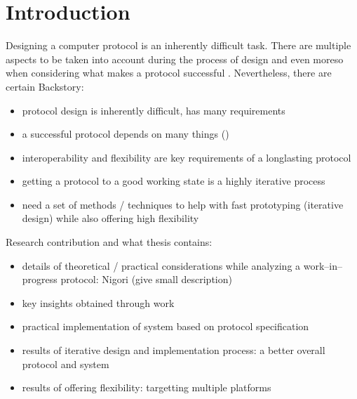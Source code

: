 \chapter{Introduction}
\setcounter{page}{1}

Designing a computer protocol is an inherently difficult task.
There are multiple aspects to be taken into account during the process of design and even moreso when considering what makes a protocol successful \cite{RFC5218}.
Nevertheless, there are certain
Backstory:
\begin{itemize}
  \item protocol design is inherently difficult, has many requirements \cite{ProtocolDesign}
  \item a successful protocol depends on many things (\cite{RFC5218})
  \item interoperability and flexibility are key requirements of a longlasting protocol
  \item getting a protocol to a good working state is a highly iterative process
  \item need a set of methods / techniques to help with fast prototyping (iterative design) while also offering high flexibility
\end{itemize}

Research contribution and what thesis contains:
\begin{itemize}
  \item details of theoretical / practical considerations while analyzing a work--in--progress protocol: Nigori (give small description)
  \item key insights obtained through work
  \item practical implementation of system based on protocol specification
  \item results of iterative design and implementation process: a better overall protocol and system
  \item results of offering flexibility: targetting multiple platforms
\end{itemize}
